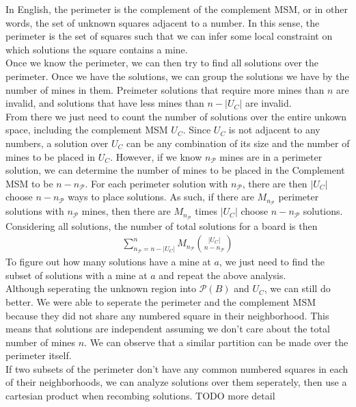 In English, the perimeter is the complement of the complement MSM, or in other words, the set of unknown squares adjacent to a number. In this sense, the perimeter is the set of squares such that we can infer some local constraint on which solutions the square contains a mine.\\

Once we know the perimeter, we can then try to find all solutions over the perimeter. Once we have the solutions, we can group the solutions we have by the number of mines in them. Preimeter solutions that require more mines than $n$ are invalid, and solutions that have less mines than $n-|U_C|$ are invalid.\\

From there we just need to count the number of solutions over the entire unkown space, including the complement MSM $U_C$. Since $U_C$ is not adjacent to any numbers, a solution over $U_C$ can be any combination of its size and the number of mines to be placed in $U_C$. However, if we know $n_\mathcal{P}$ mines are in a perimeter solution, we can determine the number of mines to be placed in the Complement MSM to be $n-n_\mathcal{P}$. For each perimeter solution with $n_\mathcal{P}$, there are then $|U_C|$ choose $n-n_\mathcal{P}$ ways to place solutions. As such, if there are $M_{n_\mathcal{P}}$ perimeter solutions with $n_\mathcal{P}$ mines, then there are $M_{n_\mathcal{P}}$ times $|U_C|$ choose $n-n_\mathcal{P}$ solutions. Considering all solutions, the number of total solutions for a board is then\begin{align*}
    \sum_{n_\mathcal{P}=n-|U_C|}^nM_{n_\mathcal{P}}{|U_C|\choose{n-n_\mathcal{P}}}
\end{align*}
To figure out how many solutions have a mine at $a$, we just need to find the subset of solutions with a mine at $a$ and repeat the above analysis.\\

Although seperating the unknown region into $\mathcal{P}(B)$ and $U_C$, we can still do better. We were able to seperate the perimeter and the complement MSM because they did not share any numbered square in their neighborhood. This means that solutions are independent assuming we don't care about the total number of mines $n$. We can observe that a similar partition can be made over the perimeter itself.\\

If two subsets of the perimeter don't have any common numbered squares in each of their neighborhoods, we can analyze solutions over them seperately, then use a cartesian product when recombing solutions. TODO more detail\\

